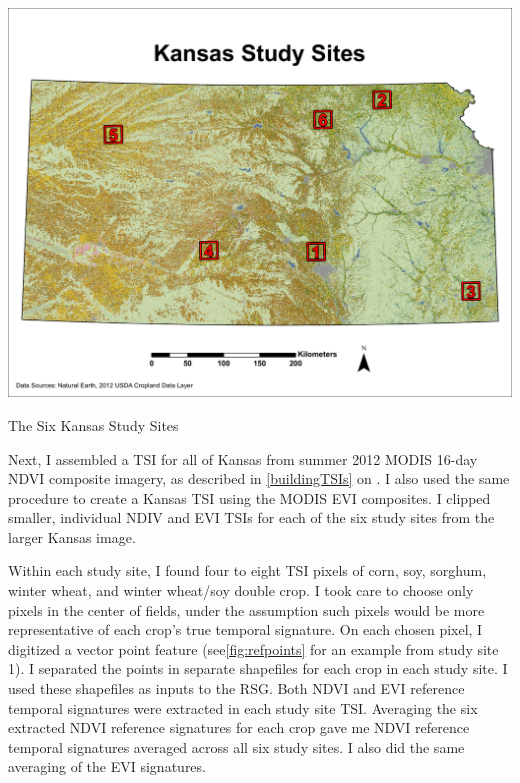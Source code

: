 \begin{ssfigure}
  \centering
  \includegraphics[width=\textwidth]{Graphics/Testing/STUDYSITES.pdf}
  \caption{The Six Kansas Study Sites}
  \label{fig:studysites}
\end{ssfigure}

Next, I assembled a TSI for all of Kansas from summer 2012 MODIS 16-day NDVI composite imagery, as described in \autoref{buildingTSIs} on . I also used the same procedure to create a Kansas TSI using the MODIS EVI composites. I clipped smaller, individual NDIV and EVI TSIs for each of the six study sites from the larger Kansas image.

Within each study site, I found four to eight TSI pixels of corn, soy, sorghum, winter wheat, and winter wheat/soy double crop. I took care to choose only pixels in the center of fields, under the assumption such pixels would be more representative of each crop’s true temporal signature. On each chosen pixel, I digitized a vector point feature (see\autoref{fig:refpoints} for an example from study site 1). I separated the points in separate shapefiles for each crop in each study site. I used these shapefiles as inputs to the RSG. Both NDVI and EVI reference temporal signatures were extracted in each study site TSI. Averaging the six extracted NDVI reference signatures for each crop gave me NDVI reference temporal signatures averaged across all six study sites. I also did the same averaging of the EVI signatures.

